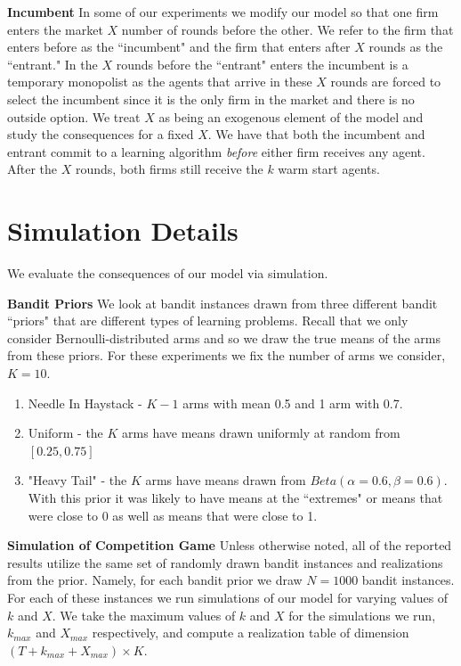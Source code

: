 \documentclass{article}
\theoremstyle{definition}
\begin{document}
\noindent \textbf{Incumbent} In some of our experiments we modify our model so that one firm enters the market $X$ number of rounds before the other. We refer to the firm that enters before as the ``incumbent" and the firm that enters after $X$ rounds as the ``entrant." In the $X$ rounds before the ``entrant" enters the incumbent is a temporary monopolist as the agents that arrive in these $X$ rounds are forced to select the incumbent since it is the only firm in the market and there is no outside option. We treat $X$ as being an exogenous element of the model and study the consequences for a fixed $X$. We have that both the incumbent and entrant commit to a learning algorithm \textit{before} either firm receives any agent. After the $X$ rounds, both firms still receive the $k$ warm start agents.

\section{Simulation Details}\label{S:3}

We evaluate the consequences of our model via simulation.

\textbf{Bandit Priors} We look at bandit instances drawn from three different bandit ``priors" that are different types of learning problems. Recall that we only consider Bernoulli-distributed arms and so we draw the true means of the arms from these priors. For these experiments we fix the number of arms we consider, $K = 10$.
\begin{enumerate}
\item Needle In Haystack - $K-1$ arms with mean 0.5 and 1 arm with 0.7.
\item Uniform - the $K$ arms have means drawn uniformly at random from $[0.25, 0.75]$
\item "Heavy Tail" - the $K$ arms have means drawn from $Beta(\alpha=0.6, \beta = 0.6)$. With this prior it was likely to have means at the ``extremes" or means that were close to 0 as well as means that were close to 1.
\end{enumerate} 

\noindent \textbf{Simulation of Competition Game} Unless otherwise noted, all of the reported results utilize the same set of randomly drawn bandit instances and realizations from the prior. Namely, for each bandit prior we draw $N = 1000$ bandit instances. For each of these instances we run simulations of our model for varying values of $k$ and $X$. We take the maximum values of $k$ and $X$ for the simulations we run, $k_{max}$ and $X_{max}$ respectively, and compute a realization table of dimension $(T+k_{max}+X_{max}) \times K$. 
\end{document}
